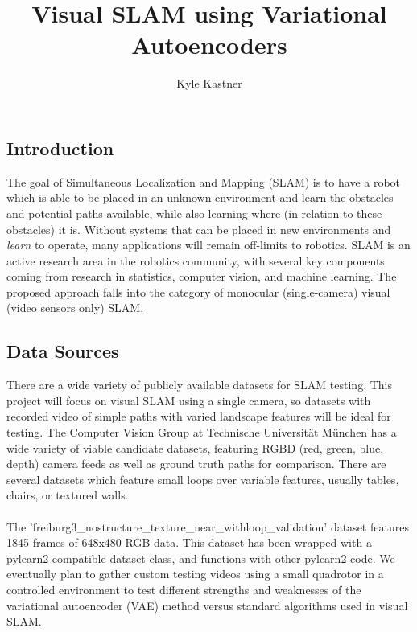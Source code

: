 \documentclass{article}
\begin{document}
\title{Visual SLAM using Variational Autoencoders}
\author{Kyle Kastner}

\maketitle
\subsection*{Introduction}
The goal of Simultaneous Localization and Mapping (SLAM) is to have a robot
which is able to be placed in an unknown environment and learn the obstacles
and potential paths available, while also learning where (in relation to these
obstacles) it is. Without systems that can be placed in new environments and
\emph{learn} to operate, many applications will remain off-limits to robotics.
SLAM is an active research area in the robotics community, with several key
components coming from research in statistics, computer vision, and
machine learning. The proposed approach falls into the category of
monocular (single-camera) visual (video sensors only) SLAM. 

\subsection*{Data Sources}
There are a wide variety of publicly available datasets for SLAM testing. 
This project will focus on visual SLAM using a single camera, so datasets with
recorded video of simple paths with varied landscape features will be ideal for
testing. The Computer Vision Group at Technische Universit\"at M\"unchen has a
wide variety of viable candidate datasets, featuring RGBD (red, green, blue, depth) camera feeds as well
as ground truth paths for comparison. There are several datasets which feature
small loops over variable features, usually tables, chairs, or textured walls.
\paragraph{}
The 'freiburg3\_nostructure\_texture\_near\_withloop\_validation' dataset 
features 1845 frames of 648x480 RGB data. This dataset has been wrapped with a
pylearn2 \cite{pylearn2_arxiv_2013} compatible dataset class, and functions
 with other pylearn2 code. We eventually plan to gather custom testing videos 
using a small quadrotor in a
controlled environment to test different strengths and weaknesses of the
variational autoencoder \cite{vae_arxiv_2014} (VAE) method versus standard 
algorithms used in visual SLAM.
\end{document}
